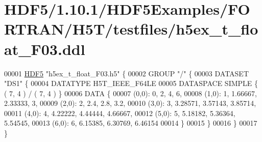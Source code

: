 \hypertarget{_h_d_f5_21_810_81_2_h_d_f5_examples_2_f_o_r_t_r_a_n_2_h5_t_2testfiles_2h5ex__t__float___f03_8ddl_source}{}\section{H\+D\+F5/1.10.1/\+H\+D\+F5\+Examples/\+F\+O\+R\+T\+R\+A\+N/\+H5\+T/testfiles/h5ex\+\_\+t\+\_\+float\+\_\+\+F03.ddl}
\label{_h_d_f5_21_810_81_2_h_d_f5_examples_2_f_o_r_t_r_a_n_2_h5_t_2testfiles_2h5ex__t__float___f03_8ddl_source}

\begin{DoxyCode}
00001 \hyperlink{namespace_h_d_f5}{HDF5} \textcolor{stringliteral}{"h5ex\_t\_float\_F03.h5"} \{
00002 GROUP \textcolor{stringliteral}{"/"} \{
00003    DATASET \textcolor{stringliteral}{"DS1"} \{
00004       DATATYPE  H5T\_IEEE\_F64LE
00005       DATASPACE  SIMPLE \{ ( 7, 4 ) / ( 7, 4 ) \}
00006       DATA \{
00007       (0,0): 0, 2, 4, 6,
00008       (1,0): 1, 1.66667, 2.33333, 3,
00009       (2,0): 2, 2.4, 2.8, 3.2,
00010       (3,0): 3, 3.28571, 3.57143, 3.85714,
00011       (4,0): 4, 4.22222, 4.44444, 4.66667,
00012       (5,0): 5, 5.18182, 5.36364, 5.54545,
00013       (6,0): 6, 6.15385, 6.30769, 6.46154
00014       \}
00015    \}
00016 \}
00017 \}
\end{DoxyCode}
